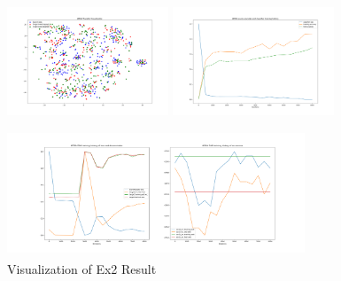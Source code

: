 \documentclass[conference]{IEEEtran}
\begin{document}
\begin{figure}[htb]
\label{fig:Ex2}
\centering
\begin{minipage}[t]{0.3\textwidth}
\includegraphics[width=1.9in, height=1.5in]{Ladda/A2R_no_dec_no_bn/ADDA_visual.png}
\end{minipage}%
\begin{minipage}[t]{0.3\textwidth}
\includegraphics[width=1.9in, height=1.5in]{Ladda/A2R_no_dec_no_bn/clf.png}
\end{minipage}%
\begin{minipage}[t]{0.45\textwidth}
\includegraphics[width=3.5in, height=1.5in]{Ladda/A2R_no_dec_no_bn/gan.png}
\end{minipage}%
\caption{Visualization of Ex2 Result}
\end{figure}
\end{document}
